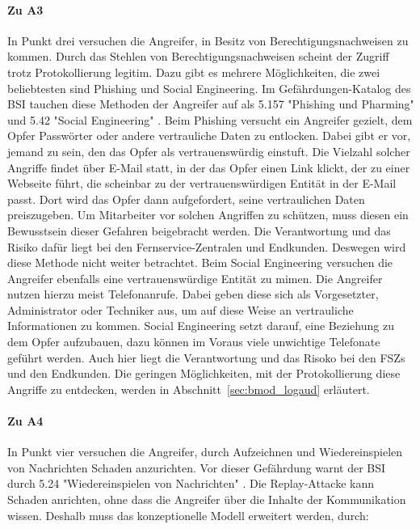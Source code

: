 \documentclass[11pt,a4paper]{report}
\begin{document}
\paragraph{Zu A3} In Punkt drei versuchen die Angreifer, in Besitz von Berechtigungsnachweisen zu kommen. Durch das Stehlen von Berechtigungsnachweisen scheint der Zugriff trotz Protokollierung legitim. Dazu gibt es mehrere Möglichkeiten, die zwei beliebtesten sind Phishing und Social Engineering. Im Gefährdungen-Katalog des BSI tauchen diese Methoden der Angreifer auf als 5.157 "Phishing und Pharming" und 5.42 "Social Engineering" \cite{bsi_g5157, bsi_g5042}. Beim Phishing versucht ein Angreifer gezielt, dem Opfer Passwörter oder andere vertrauliche Daten zu entlocken. Dabei gibt er vor, jemand zu sein, den das Opfer als vertrauenswürdig einstuft. Die Vielzahl solcher Angriffe findet über E-Mail statt, in der das Opfer einen Link klickt, der zu einer Webseite führt, die scheinbar zu der vertrauenswürdigen Entität in der E-Mail passt. Dort wird das Opfer dann aufgefordert, seine vertraulichen Daten preiszugeben. Um Mitarbeiter vor solchen Angriffen zu schützen, muss diesen ein Bewusstsein dieser Gefahren beigebracht werden. Die Verantwortung und das Risiko dafür liegt bei den Fernservice-Zentralen und Endkunden. Deswegen wird diese Methode nicht weiter betrachtet. Beim Social Engineering versuchen die Angreifer ebenfalls eine vertrauenswürdige Entität zu mimen. Die Angreifer nutzen hierzu meist Telefonanrufe. Dabei geben diese sich als Vorgesetzter, Administrator oder Techniker aus, um auf diese Weise an vertrauliche Informationen zu kommen. Social Engineering setzt darauf, eine Beziehung zu dem Opfer aufzubauen, dazu können im Voraus viele unwichtige Telefonate geführt werden. Auch hier liegt die Verantwortung und das Risoko bei den FSZs und den Endkunden. Die geringen Möglichkeiten, mit der Protokollierung diese Angriffe zu entdecken, werden in Abschnitt~\ref{sec:bmod_logaud} erläutert.

\paragraph{Zu A4} In Punkt vier versuchen die Angreifer, durch Aufzeichnen und Wiedereinspielen von Nachrichten Schaden anzurichten. Vor dieser Gefährdung warnt der BSI durch 5.24 "Wiedereinspielen von Nachrichten" \cite{bsi_g5024}. Die Replay-Attacke kann Schaden anrichten, ohne dass die Angreifer über die Inhalte der Kommunikation wissen. Deshalb muss das konzeptionelle Modell erweitert werden, durch:
\end{document}
